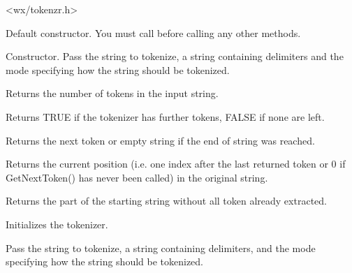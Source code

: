 


<wx/tokenzr.h>


\label{wxstringtokenizerwxstringtokenizer}


Default constructor. You must call 
 before calling any other
methods.


Constructor. Pass the string to tokenize, a string containing delimiters
and the mode specifying how the string should be tokenized.

\label{wxstringtokenizercounttokens}


Returns the number of tokens in the input string.

\label{wxstringtokenizerhasmoretokens}


Returns TRUE if the tokenizer has further tokens, FALSE if none are left.

\label{wxstringtokenizergetnexttoken}


Returns the next token or empty string if the end of string was reached.

\label{wxstringtokenizergetposition}


Returns the current position (i.e. one index after the last returned
token or 0 if GetNextToken() has never been called) in the original
string.

\label{wxstringtokenizergetstring}


Returns the part of the starting string without all token already extracted.

\label{wxstringtokenizersetstring}


Initializes the tokenizer.

Pass the string to tokenize, a string containing delimiters,
and the mode specifying how the string should be tokenized.

